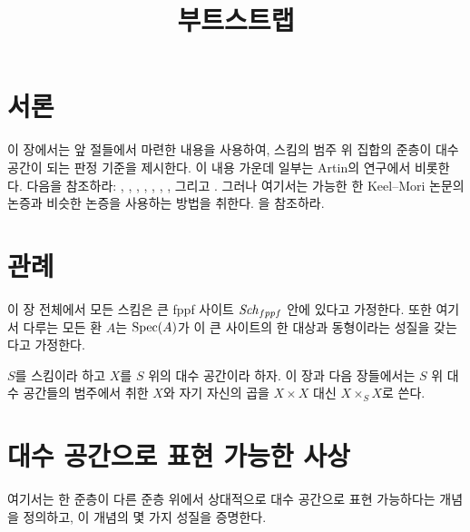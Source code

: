 

%


\title{부트스트랩}

\maketitle

\label{section-phantom}

\tableofcontents




\section{서론}
\label{section-introduction}

\noindent
이 장에서는 앞 절들에서 마련한 내용을 사용하여, 스킴의 범주 위 집합의
준층이 대수 공간이 되는 판정 기준을 제시한다. 이 내용 가운데 일부는
Artin의 연구에서 비롯한다. 다음을 참조하라:
\cite{ArtinI}, \cite{ArtinII},
\cite{Artin-Theorem-Representability},
\cite{Artin-Construction-Techniques},
\cite{Artin-Algebraic-Spaces},
\cite{Artin-Algebraic-Approximation},
\cite{Artin-Implicit-Function},
그리고 \cite{ArtinVersal}.
그러나 여기서는 가능한 한 Keel--Mori 논문의 논증과 비슷한
논증을 사용하는 방법을 취한다. \cite{K-M}을 참조하라.

\section{관례}
\label{section-conventions}

\noindent
이 장 전체에서 모든 스킴은 큰 fppf 사이트 $\mathit{Sch}_{fppf}$ 안에 있다고
가정한다. 또한 여기서 다루는 모든 환 $A$는 $\mathop{\mathrm{Spec}}(A)$가 이 큰
사이트의 한 대상과 동형이라는 성질을 갖는다고 가정한다.

\medskip\noindent
$S$를 스킴이라 하고 $X$를 $S$ 위의 대수 공간이라 하자.
이 장과 다음 장들에서는 $S$ 위 대수 공간들의 범주에서 취한 $X$와
자기 자신의 곱을 $X \times X$ 대신 $X \times_S X$로 쓴다.




\section{대수 공간으로 표현 가능한 사상}
\label{section-morphism-representable-by-spaces}

\noindent
여기서는 한 준층이 다른 준층 위에서 상대적으로 대수 공간으로
표현 가능하다는 개념을 정의하고, 이 개념의 몇 가지 성질을 증명한다.

